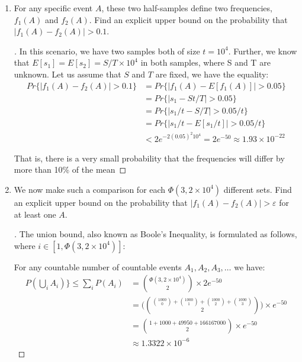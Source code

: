 \documentclass[]{book}
\theoremstyle{definition}
\begin{document}
\begin{enumerate}
\item\label{norms}

For any specific event $A$, these two half-samples define two frequencies, $f_{1}(A)$ and $f_{2}(A)$. Find an explicit upper bound on the probability that $|f_{1}(A) - f_{2}(A)| > 0.1$.

\begin{proof}[\unskip\nopunct]

In this scenario, we have two samples both of size $t = 10^{4}$. Further, we know that $E[s_{1}] = E[s_{2}] = S/T \times 10^{4}$ in both samples, where S and T are unknown. Let us assume that $S$ and $T$ are fixed, we have the equality:
	\begin{equation*}
		\begin{split}
		Pr\{|f_{1}(A) - f_{2}(A)| > 0.1\} & = Pr\{|f_{1}(A) - E[f_{1}(A)]| > 0.05\} \\
		& = Pr\{|s_{1} - St/T| > 0.05\} \\
		& = Pr\{|s_{1}/t - S/T| > 0.05/t\} \\
		& = Pr\{|s_{1}/t - E[s_{1}/t]| > 0.05/t\} \\
		& < 2e^{-2(0.05)^{2}10^{4}} = 2e^{-50} \approx 1.93 \times 10^{-22}
		\end{split}
	\end{equation*}

That is, there is a very small probability that the frequencies will differ by more than 10\% of the mean
\end{proof}

\item

We now make such a comparison for each $\Phi(3,2 \times 10^{4})$ different sets. Find an explicit upper bound on the probability that $|f_{1}(A) - f_{2}(A)| > \varepsilon$ for at least one $A$.

\begin{proof}[\unskip\nopunct]
The union bound, also known as Boole's Inequality, is formulated as follows, where $i \in [1,\Phi(3,2\times10^{4})]$:

For any countable number of countable events $A_{1}, A_{2}, A_{3}, \ldots$ we have:
	\begin{equation*}
		\begin{split}
			P(\bigcup_{i} A_{i}) \} \leq \sum_{i}P(A_{i}) & = {\Phi(3,2\times10^{4}) \choose 2} \times 2e^{-50} \\
			& = \Bigg( {{1000 \choose 0} + {1000 \choose 1} + {1000 \choose 2} + {1000 \choose 3} \choose 2}\Bigg) \times e^{-50} \\
			& = {1+1000+49950+166167000 \choose 2}\times e^{-50} \\
			& \approx 1.3322 \times 10^{-6}
		\end{split}
	\end{equation*} 
	

\end{proof}
\end{enumerate}
\end{document}
